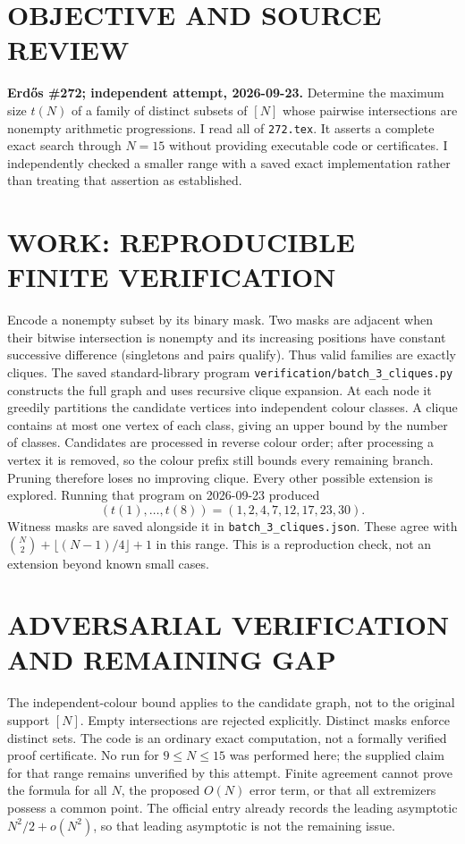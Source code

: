 \section{OBJECTIVE AND SOURCE REVIEW}
\textbf{Erd\H{o}s \#272; independent attempt, 2026-09-23.}
Determine the maximum size $t(N)$ of a family of distinct subsets of $[N]$ whose pairwise intersections are nonempty arithmetic progressions. I read all of \texttt{272.tex}. It asserts a complete exact search through $N=15$ without providing executable code or certificates. I independently checked a smaller range with a saved exact implementation rather than treating that assertion as established.
\section{WORK: REPRODUCIBLE FINITE VERIFICATION}
Encode a nonempty subset by its binary mask. Two masks are adjacent when their bitwise intersection is nonempty and its increasing positions have constant successive difference (singletons and pairs qualify). Thus valid families are exactly cliques.
The saved standard-library program \texttt{verification/batch\_3\_cliques.py} constructs the full graph and uses recursive clique expansion. At each node it greedily partitions the candidate vertices into independent colour classes. A clique contains at most one vertex of each class, giving an upper bound by the number of classes. Candidates are processed in reverse colour order; after processing a vertex it is removed, so the colour prefix still bounds every remaining branch. Pruning therefore loses no improving clique. Every other possible extension is explored.
Running that program on 2026-09-23 produced
\[
(t(1),\ldots,t(8))=(1,2,4,7,12,17,23,30).
\]
Witness masks are saved alongside it in \texttt{batch\_3\_cliques.json}. These agree with $\binom N2+\lfloor(N-1)/4\rfloor+1$ in this range. This is a reproduction check, not an extension beyond known small cases.
\section{ADVERSARIAL VERIFICATION AND REMAINING GAP}
The independent-colour bound applies to the candidate graph, not to the original support $[N]$. Empty intersections are rejected explicitly. Distinct masks enforce distinct sets. The code is an ordinary exact computation, not a formally verified proof certificate. No run for $9\le N\le15$ was performed here; the supplied claim for that range remains unverified by this attempt. Finite agreement cannot prove the formula for all $N$, the proposed $O(N)$ error term, or that all extremizers possess a common point. The official entry already records the leading asymptotic $N^2/2+o(N^2)$, so that leading asymptotic is not the remaining issue.
